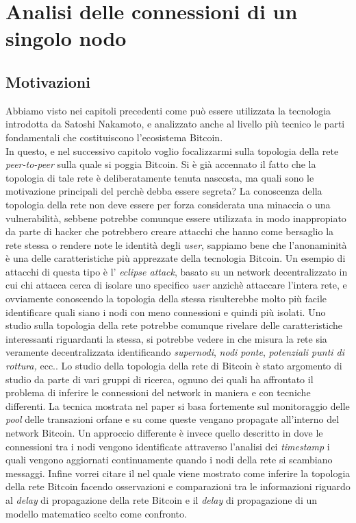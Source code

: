 \chapter{Analisi delle connessioni di un singolo nodo}



\vspace*{1cm}

\section{Motivazioni}
Abbiamo visto nei capitoli precedenti come pu\`o essere utilizzata la tecnologia introdotta da Satoshi Nakamoto, e analizzato anche al livello pi\`u tecnico le parti fondamentali che costituiscono l'ecosistema Bitcoin.\\
In questo, e nel successivo capitolo voglio focalizzarmi sulla topologia della rete \textit{peer-to-peer} sulla quale si poggia Bitcoin.
Si \`e gi\`a accennato il fatto che la topologia di tale rete \`e deliberatamente tenuta nascosta, ma quali sono le motivazione principali del perch\`e debba essere segreta?
La conoscenza della topologia della rete non deve essere per forza considerata una minaccia o una vulnerabilit\`a, sebbene potrebbe comunque essere utilizzata in modo inappropiato da parte di hacker che potrebbero creare attacchi che hanno come bersaglio la rete stessa o rendere note le identit\`a degli \textit{user}, sappiamo bene che l'anonaminit\`a \`e una delle caratteristiche pi\`u apprezzate della tecnologia Bitcoin.
Un esempio di attacchi di questa tipo \`e l' \textit{eclipse attack}, basato su un network decentralizzato in cui chi attacca cerca di isolare uno specifico \textit{user} anzich\`e attaccare l'intera rete, e ovviamente conoscendo la topologia della stessa risulterebbe molto pi\`u facile identificare quali siano i nodi con meno connessioni e quindi pi\`u isolati.
Uno studio sulla topologia della rete potrebbe comunque rivelare delle caratteristiche interessanti riguardanti la stessa, si potrebbe vedere in che misura la rete sia veramente decentralizzata identificando \textit{supernodi}, \textit{nodi ponte}, \textit{potenziali punti di rottura,} ecc.. 
Lo studio della topologia della rete di Bitcoin \`e stato argomento di studio da parte di vari gruppi di ricerca, ognuno dei quali ha affrontato il problema di inferire le connessioni del network in maniera e con tecniche differenti.
La tecnica mostrata nel paper \cite{delgado2018txprobe} si basa fortemente sul monitoraggio delle \textit{pool} delle transazioni orfane e su come queste vengano propagate all'interno del network Bitcoin. Un approccio differente \`e invece quello descritto in \cite{miller2015discovering} dove le connessioni tra i nodi vengono identificate attraverso l'analisi dei \textit{timestamp} i quali vengono aggiornati continuamente quando i nodi della rete si scambiano messaggi. Infine vorrei citare il \cite{neudecker2016timing} nel quale viene mostrato come inferire la topologia della rete Bitcoin facendo osservazioni e comparazioni tra le informazioni riguardo al \textit{delay} di propagazione della rete Bitcoin e il \textit{delay} di propagazione di un modello matematico scelto come confronto. \\
